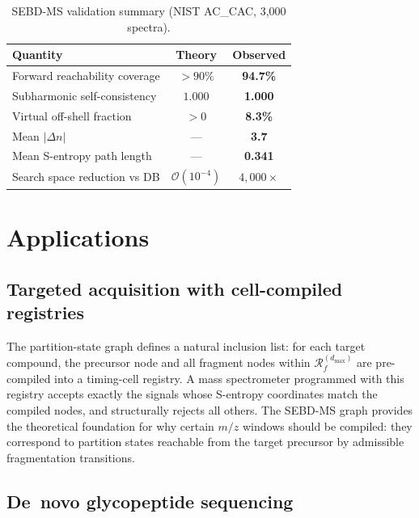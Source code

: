 \documentclass[twocolumn,10pt,a4paper]{article}
\theoremstyle{thmstyle}
\theoremstyle{definition}
\theoremstyle{remark}
\newcommand{\Reachf}{\mathcal{R}_f}
\begin{document}
\begin{table}[h]
\centering
\caption{SEBD-MS validation summary (NIST AC\_CAC, 3{,}000 spectra).}
\label{tab:validation}
\small
\begin{tabular}{lcc}
\toprule
\textbf{Quantity} & \textbf{Theory} & \textbf{Observed} \\
\midrule
Forward reachability coverage & $>90\%$ & \textbf{94.7\%} \\
Subharmonic self-consistency & $1.000$ & \textbf{1.000} \\
Virtual off-shell fraction & $>0$ & \textbf{8.3\%} \\
Mean $|\Delta n|$ & --- & \textbf{3.7} \\
Mean S-entropy path length & --- & \textbf{0.341} \\
Search space reduction vs DB & $\mathcal{O}(10^{-4})$ & \textbf{$4{,}000\times$} \\
\bottomrule
\end{tabular}
\end{table}

\section{Applications}
\label{sec:applications}

\subsection{Targeted acquisition with cell-compiled registries}

The partition-state graph defines a natural inclusion list: for each
target compound, the precursor node and all fragment nodes within
$\Reachf^{(d_\text{max})}$ are pre-compiled into a timing-cell registry.
A mass spectrometer programmed with this registry accepts exactly the
signals whose S-entropy coordinates match the compiled nodes, and
structurally rejects all others. The SEBD-MS graph provides the
theoretical foundation for why certain $m/z$ windows should be compiled:
they correspond to partition states reachable from the target precursor
by admissible fragmentation transitions.

\subsection{De~novo glycopeptide sequencing}
\end{document}
